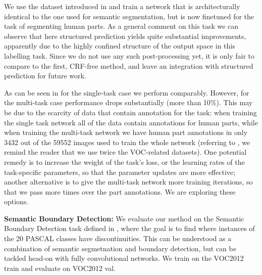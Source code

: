 \documentclass[10pt,twocolumn,letterpaper]{article}
\begin{document}
 We use the dataset introduced in \cite{chen_cvpr14} and train a network that is architecturally identical to the one used for semantic segmentation, but is now finetuned for the task of segmenting human parts. As a general comment on this task we can observe that here structured prediction yields  quite substantial improvements, apparently due to the highly confined structure of the output space in this labelling task. Since we do not use any such post-processing yet, it is only fair to compare to the first, CRF-free method, and leave an integration with structured prediction for future work.
 
 As can be seen in  for the single-task case we perform comparably. 
 However,  for the multi-task case performance drops substantially (more than 10$\%$). This  may be due to the scarcity of data that contain annotation for the task: when training the single task network all of the data contain annotations for human parts, while when training the multi-task network we have human part annotations in only 3432 out of  the 59552 images used to train the whole network (referring to , we remind the reader that we use twice the VOC-related datasets).
One potential remedy is to increase the weight of the task's loss, or the learning rates of the task-specific parameters, so that the parameter updates are more effective; another alternative is to give the multi-task network more training iterations, so that we pass more times over the part annotations. We are exploring these options. 
 

\textbf{Semantic Boundary Detection:}
 We evaluate our method on the Semantic Boundary Detection task defined in 
 \cite{hariharan2011semantic}, where the goal is to find where instances of the 20 PASCAL classes have discontinuities. This can be understood as a combination of semantic segmetnation and boundary detection, but can be tackled head-on with fully convolutional networks. 
 We train on the VOC2012 train and evaluate on VOC2012 val.
 
\end{document}
